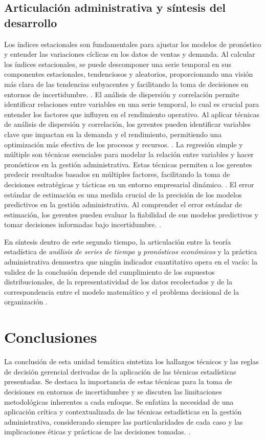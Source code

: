 {\subsection{Articulación administrativa y síntesis del desarrollo}
Los índices estacionales son fundamentales para ajustar los modelos de pronóstico y entender las variaciones cíclicas en los datos de ventas y demanda. Al calcular los índices estacionales, se puede descomponer una serie temporal en sus componentes estacionales, tendenciosos y aleatorios, proporcionando una visión más clara de las tendencias subyacentes y facilitando la toma de decisiones en entornos de incertidumbre. \citep{holmesBusiness2023,nistHandbook}.
El análisis de dispersión y correlación permite identificar relaciones entre variables en una serie temporal, lo cual es crucial para entender los factores que influyen en el rendimiento operativo. Al aplicar técnicas de análisis de dispersión y correlación, los gerentes pueden identificar variables clave que impactan en la demanda y el rendimiento, permitiendo una optimización más efectiva de los procesos y recursos. \citep{holmesBusiness2023,nistHandbook}.
La regresión simple y múltiple son técnicas esenciales para modelar la relación entre variables y hacer pronósticos en la gestión administrativa. Estas técnicas permiten a los gerentes predecir resultados basados en múltiples factores, facilitando la toma de decisiones estratégicas y tácticas en un entorno empresarial dinámico. \citep{holmesBusiness2023,nistHandbook}.
El error estándar de estimación es una medida crucial de la precisión de los modelos predictivos en la gestión administrativa. Al comprender el error estándar de estimación, los gerentes pueden evaluar la fiabilidad de sus modelos predictivos y tomar decisiones informadas bajo incertidumbre. \citep{holmesBusiness2023,nistHandbook}.

En síntesis dentro de este segundo tiempo, la articulación entre la teoría estadística de \textit{análisis de series de tiempo y pronósticos económicos} y la práctica administrativa demuestra que ningún indicador cuantitativo opera en el vacío: la validez de la conclusión depende del cumplimiento de los supuestos distribucionales, de la representatividad de los datos recolectados y de la correspondencia entre el modelo matemático y el problema decisional de la organización \citep{anderson2012,nistHandbook,guarin2002}.

\clearpage
\section{Conclusiones}
La conclusión de esta unidad temática sintetiza los hallazgos técnicos y las reglas de decisión gerencial derivadas de la aplicación de las técnicas estadísticas presentadas. Se destaca la importancia de estas técnicas para la toma de decisiones en entornos de incertidumbre y se discuten las limitaciones metodológicas inherentes a cada enfoque. Se enfatiza la necesidad de una aplicación crítica y contextualizada de las técnicas estadísticas en la gestión administrativa, considerando siempre las particularidades de cada caso y las implicaciones éticas y prácticas de las decisiones tomadas. \citep{anderson2012,lind2012,wackerly2010,diazRodriguez2022}.
}

